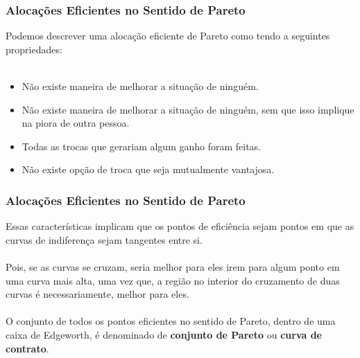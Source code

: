 \documentclass{beamer}[10]
\begin{document}
\begin{frame}
	\frametitle{Alocações Eficientes no Sentido de Pareto}

	Podemos descrever uma alocação eficiente de Pareto como tendo a seguintes propriedades:
	\\~\\
	\begin{itemize}
		\item Não existe maneira de melhorar a situação de ninguém.
		\item Não existe maneira de melhorar a situação de ninguém, sem que isso implique na piora de outra pessoa.
		\item Todas as trocas que gerariam algum ganho foram feitas.
		\item Não existe opção de troca que seja mutualmente vantajosa.
	\end{itemize}

\end{frame}

\begin{frame}
	\frametitle{Alocações Eficientes no Sentido de Pareto}

	Essas características implicam que os pontos de eficiência sejam pontos em que as curvas de indiferença sejam tangentes entre si. 
	\\~\\
	Pois, se as curvas se cruzam, seria melhor para eles irem para algum ponto em uma curva mais alta, uma vez que, a região no interior do cruzamento de duas curvas é necessariamente, melhor para eles.
	\\~\\
	O conjunto de todos os pontos eficientes no sentido de Pareto, dentro de uma caixa de Edgeworth, é denominado de \textbf{conjunto de Pareto} ou \textbf{curva de contrato}.

\end{frame}
\end{document}

